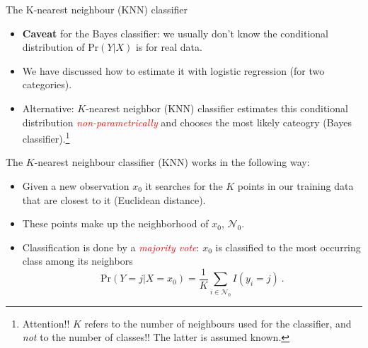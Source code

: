 \documentclass[10pt,ignorenonframetext,]{beamer}
\providecommand{\tightlist}{%
  \setlength{\itemsep}{0pt}\setlength{\parskip}{0pt}}
\begin{document}
\begin{frame}{The K-nearest neighbour (KNN) classifier}

\begin{itemize}
\tightlist
\item
  \textbf{Caveat} for the Bayes classifier: we usually don't know the
  conditional distribution of \(\text{Pr}(Y | X)\) is for real data.
\end{itemize}

\vspace{1mm}

\begin{itemize}
\tightlist
\item
  We have discussed how to estimate it with logistic regression (for two
  categories).
\end{itemize}

\vspace{1mm}

\begin{itemize}
\tightlist
\item
  Alternative: \(K\)-nearest neighbor (KNN) classifier estimates this
  conditional distribution \emph{\textcolor{red}{non-parametrically}}
  and chooses the most likely cateogry (Bayes
  classifier).\footnote{Attention!! $K$ refers to the number of neighbours used for the classifier, and \emph{not} to the number of classes!! The latter is assumed known.}
\end{itemize}

\end{frame}

\begin{frame}

\vspace{2mm} The \(K\)-nearest neighbour classifier (KNN) works in the
following way:

\begin{itemize}
\item
  Given a new observation \(x_0\) it searches for the \(K\) points in
  our training data that are closest to it (Euclidean distance).
  \vspace{1mm}
\item
  These points make up the neighborhood of \(x_0\), \(\mathcal{N}_0\).
  \vspace{1mm}
\item
  Classification is done by a \emph{\textcolor{red}{majority vote}}:
  \(x_0\) is classified to the most occurring class among its neighbors
  \[\text{Pr}(Y=j | X = x_0) = \frac{1}{K} \sum_{i \in \mathcal{N}_0} I(y_i = j)\ .\]
\end{itemize}

\end{frame}
\end{document}
